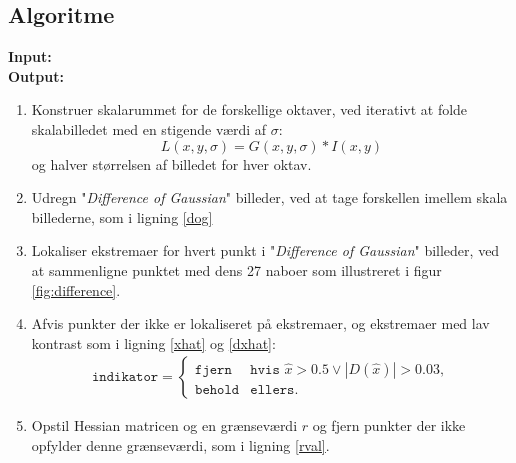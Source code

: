 \subsection{Algoritme}
\textbf{Input:} \\
\textbf{Output:}
\begin{enumerate}
\item{Konstruer skalarummet for de forskellige oktaver, ved iterativt at folde skalabilledet med en stigende værdi af $\sigma$: $$ L(x,y,\sigma)= G(x,y,\sigma) \ast I(x,y) $$
og halver størrelsen af billedet for hver oktav.}
\item{Udregn "\textit{Difference of Gaussian}" billeder, ved at tage forskellen imellem skala billederne, som i ligning \eqref{dog}}
\item{Lokaliser ekstremaer for hvert punkt i "\textit{Difference of Gaussian}" billeder, ved at sammenligne punktet med dens 27 naboer som illustreret i figur \ref{fig:difference}.}

\item{Afvis punkter der ikke er lokaliseret på ekstremaer, og ekstremaer med lav kontrast som i ligning \eqref{xhat} og \eqref{dxhat}:
\begin{equation}
\begin{split}
\texttt{indikator} = 
\begin{cases}
\texttt{fjern}& \texttt{hvis } \hat{x}>0.5 \lor |D(\hat{x})|>0.03 , \\
\texttt{behold}& \texttt{ellers}. 
\end{cases}
\end{split}
\end{equation}
}
\item{Opstil Hessian matricen og en grænseværdi $r$ og fjern punkter der ikke opfylder denne grænseværdi, som i ligning \eqref{rval}.}
\end{enumerate}